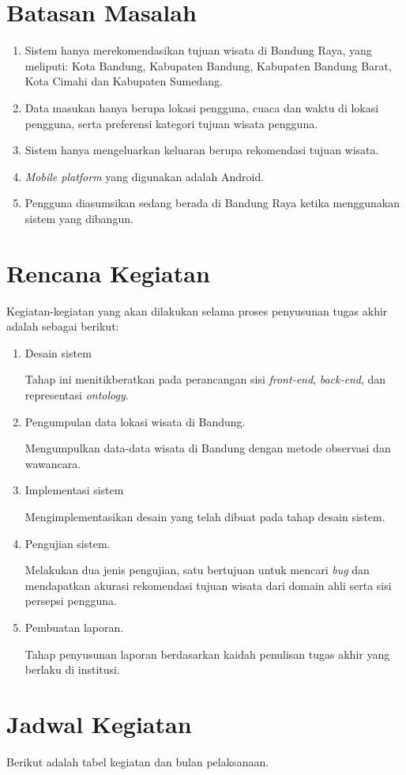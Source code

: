 \section{Batasan Masalah}
\begin{enumerate}
	\item Sistem hanya merekomendasikan tujuan wisata di Bandung Raya, yang meliputi: Kota Bandung, Kabupaten Bandung, Kabupaten Bandung Barat, Kota Cimahi dan Kabupaten Sumedang.
	\item Data masukan hanya berupa lokasi pengguna, cuaca  dan waktu di lokasi pengguna, serta preferensi kategori tujuan wisata pengguna.
	\item Sistem hanya mengeluarkan keluaran berupa rekomendasi tujuan wisata.
	\item \textit{Mobile platform} yang digunakan adalah Android.
	\item Pengguna diasumsikan sedang berada di Bandung Raya ketika menggunakan sistem yang dibangun. 
\end{enumerate}
\section{Rencana Kegiatan}
Kegiatan-kegiatan yang akan dilakukan selama proses penyusunan tugas akhir adalah sebagai berikut:
\begin{enumerate}
	\item Desain sistem
	\par
	Tahap ini menitikberatkan pada perancangan sisi \textit{front-end}, \textit{back-end}, dan representasi \textit{ontology}.
	\item Pengumpulan data lokasi wisata di Bandung.
	\par
	Mengumpulkan data-data wisata di Bandung dengan metode observasi dan wawancara.
	\item Implementasi sistem
	\par
	Mengimplementasikan desain yang telah dibuat pada tahap desain sistem.
	\item Pengujian sistem.
	\par
	Melakukan dua jenis pengujian, satu bertujuan untuk mencari \textit{bug} dan mendapatkan akurasi rekomendasi tujuan wisata dari domain ahli serta sisi 
	persepsi pengguna. 
	\item Pembuatan laporan.
	\par
	Tahap penyusunan laporan berdasarkan kaidah penulisan tugas akhir yang berlaku di institusi.
\end{enumerate}
\section{Jadwal Kegiatan}
Berikut adalah tabel kegiatan dan bulan pelaksanaan.
 
